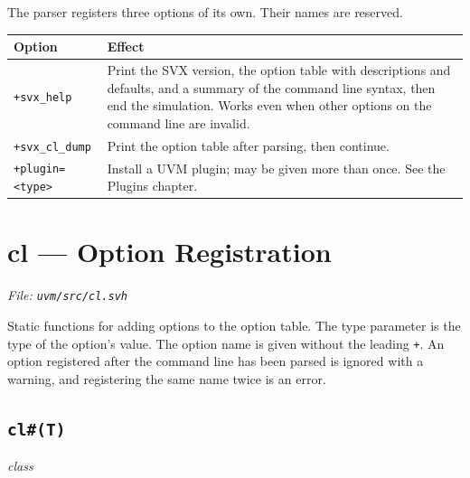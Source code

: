 \documentclass[11pt,letterpaper]{report}
\begin{document}
The parser registers three options of its own. Their names are reserved.

\begin{xltabular}{\linewidth}{>{\small}p{1.5in} >{\small}X}
\toprule
\textbf{Option} & \textbf{Effect} \\
\midrule
\endhead
\bottomrule
\endfoot
\texttt{+svx\_help} & Print the SVX version, the option table with descriptions and defaults, and a summary of the command line syntax, then end the simulation. Works even when other options on the command line are invalid. \\
\texttt{+svx\_cl\_dump} & Print the option table after parsing, then continue. \\
\texttt{+plugin=\textless{}type\textgreater{}} & Install a UVM plugin; may be given more than once. See the Plugins chapter. \\
\end{xltabular}

\section{cl --- Option Registration}
\noindent\small\textit{File: \texttt{uvm/src/cl.svh}}\par

Static functions for adding options to the option table. The type parameter is the type of the option's value. The option name is given without the leading \texttt{+}. An option registered after the command line has been parsed is ignored with a warning, and registering the same name twice is an error.

\subsection*{\texttt{cl\#(T)}}
\noindent\small\textit{class}\par
\end{document}
